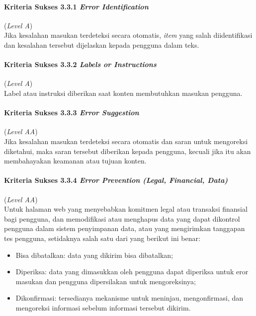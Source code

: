\paragraph{Kriteria Sukses 3.3.1 \textit{Error Identification}}
\label{subsec:kriteria_3.3.1}
(\textit{Level A}) \\

Jika kesalahan masukan terdeteksi secara otomatis, \textit{item} yang salah diidentifikasi dan kesalahan tersebut dijelaskan kepada pengguna dalam teks.

\paragraph{Kriteria Sukses 3.3.2 \textit{Labels or Instructions}}
\label{subsec:kriteria_3.3.2}
(\textit{Level A}) \\

Label atau instruksi diberikan saat konten membutuhkan masukan pengguna.

\paragraph{Kriteria Sukses 3.3.3 \textit{Error Suggestion}}
\label{subsec:kriteria_3.3.3}
(\textit{Level AA}) \\

Jika kesalahan masukan terdeteksi secara otomatis dan saran untuk mengoreksi diketahui, maka saran tersebut diberikan kepada pengguna, kecuali jika itu akan membahayakan keamanan atau tujuan konten.

\paragraph{Kriteria Sukses 3.3.4 \textit{Error Prevention (Legal, Financial, Data)}}
\label{subsec:kriteria_3.3.4}
(\textit{Level AA}) \\

Untuk halaman web yang menyebabkan komitmen legal atau transaksi finansial bagi pengguna, dan memodifikasi atau menghapus data yang dapat dikontrol pengguna dalam sistem penyimpanan data, atau yang mengirimkan tanggapan tes pengguna, setidaknya salah satu dari yang berikut ini benar:

\begin{itemize}
	\item Bisa dibatalkan: data yang dikirim bisa dibatalkan;
	\item Diperiksa: data yang dimasukkan oleh pengguna dapat diperiksa untuk eror masukan dan pengguna dipersilakan untuk mengoreksinya;
	\item Dikonfirmasi: tersedianya mekanisme untuk meninjau, mengonfirmasi, dan mengoreksi informasi sebelum informasi tersebut dikirim.
\end{itemize}


